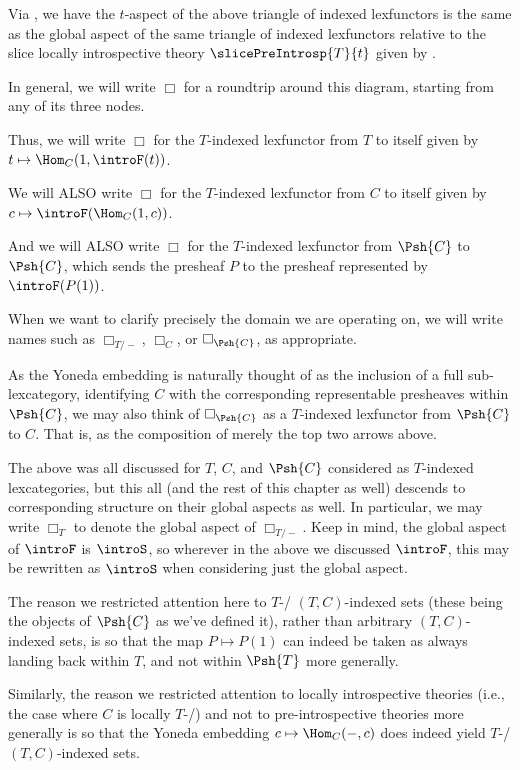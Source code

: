 \begin{observation}\label{SliceBoxIsAspectBox}
Via , we have the $t$-aspect of the above triangle of indexed lexfunctors is the same as the global aspect of the same triangle of indexed lexfunctors relative to the slice locally introspective theory $\slicePreIntrosp{T}{t}$ given by . 
\end{observation}

\begin{definition}\label{BoxDefn}
In general, we will write $\Box$ for a roundtrip around this diagram, starting from any of its three nodes.

Thus, we will write $\Box$ for the $T$-indexed lexfunctor from $T$ to itself given by $t \mapsto \Hom_C(1, \introF(t))$.

We will ALSO write $\Box$ for the $T$-indexed lexfunctor from $C$ to itself given by $c \mapsto \introF(\Hom_C(1, c))$.

And we will ALSO write $\Box$ for the $T$-indexed lexfunctor from $\Psh{C}$ to $\Psh{C}$, which sends the presheaf $P$ to the presheaf represented by $\introF(P(1))$.

When we want to clarify precisely the domain we are operating on, we will write names such as $\Box_{T/-}$, $\Box_C$, or $\Box_{\Psh{C}}$, as appropriate.

As the Yoneda embedding is naturally thought of as the inclusion of a full sub-lexcategory, identifying $C$ with the corresponding representable presheaves within $\Psh{C}$, we may also think of $\Box_{\Psh{C}}$ as a $T$-indexed lexfunctor from $\Psh{C}$ to $C$. That is, as the composition of merely the top two arrows above.
\end{definition}

The above was all discussed for $T$, $C$, and $\Psh{C}$ considered as $T$-indexed lexcategories, but this all (and the rest of this chapter as well) descends to corresponding structure on their global aspects as well. In particular, we may write $\Box_{T}$ to denote the global aspect of $\Box_{T/-}$. Keep in mind, the global aspect of $\introF$ is $\introS$, so wherever in the above we discussed $\introF$, this may be rewritten as $\introS$ when considering just the global aspect.

\bigskip
\begin{remark}\label{BoxNotationSmallnessConcerns}
The reason we restricted attention here to $T$-\repsmall/ $(T, C)$-indexed sets (these being the objects of $\Psh{C}$ as we've defined it), rather than arbitrary $(T, C)$-indexed sets, is so that the map $P \mapsto P(1)$ can indeed be taken as always landing back within $T$, and not within $\Psh{T}$ more generally.

Similarly, the reason we restricted attention to locally introspective theories (i.e., the case where $C$ is locally $T$-\repsmall/) and not to pre-introspective theories more generally is so that the Yoneda embedding $c \mapsto \Hom_C(-, c)$ does indeed yield $T$-\repsmall/ $(T, C)$-indexed sets.
\end{remark}

